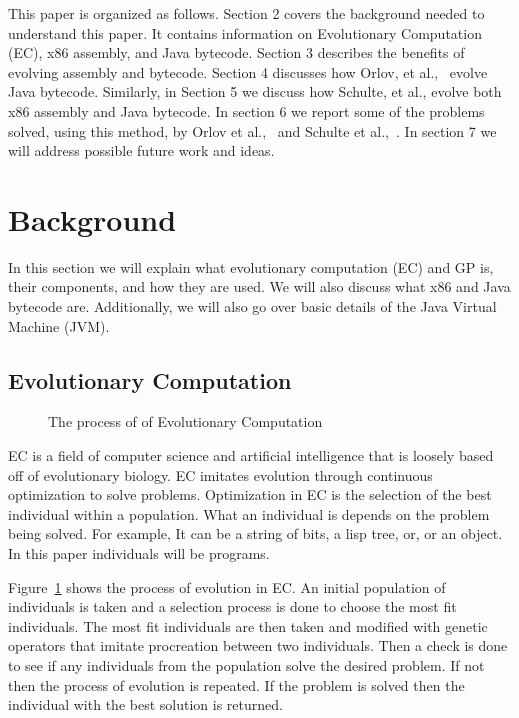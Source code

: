 \documentclass{sig-alternate}
\begin{document}
This paper is organized as follows. Section 2 covers the background needed to understand this paper. It contains information on Evolutionary Computation (EC), x86 assembly, and Java bytecode. Section 3 describes the benefits of evolving assembly and bytecode. Section 4 discusses how Orlov, et al.,~\cite{FINCH:2011} evolve Java bytecode. Similarly, in Section 5 we discuss how Schulte, et al., evolve both x86 assembly and Java bytecode. In section 6 we report some of the problems solved, using this method, by Orlov et al.,~\cite{FINCH:2011} and Schulte et al.,~\cite{Assembly:2010}. In section 7 we will address possible future work and ideas.
	
	

\section{Background}


In this section we will explain what evolutionary computation (EC) and GP is, their components, and how they are used. We will also discuss what x86 and Java bytecode are. Additionally, we will also go over basic details of the Java Virtual Machine (JVM).
\subsection{Evolutionary Computation}
\begin{figure}
\centering
{}

\caption{The process of of Evolutionary Computation}
\label{ECdiagram}
\end{figure}


EC is a field of computer science and artificial intelligence that is loosely based off of evolutionary biology. EC imitates evolution through continuous optimization to solve problems. Optimization in EC is the selection of the best individual within a population. What an individual is depends on the problem being solved. For example, It can be a string of bits, a lisp tree, or, or an object. In this paper individuals will be programs.\par 

Figure~\ref{ECdiagram} shows the process of evolution in EC. An initial population of individuals is taken and a selection process is done to choose the most fit individuals. The most fit individuals are then taken and modified with genetic operators that imitate procreation between two individuals. Then a check is done to see if any individuals from the population solve the desired problem. If not then the process of evolution is repeated. If the problem is solved then the individual with the best solution is returned.\par
\end{document}
